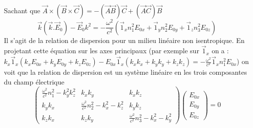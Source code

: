 Sachant que $\vec A\times(\vec B\times \vec C) = -(\vec A\vec B)\vec C+(\vec A\vec C)\vec B$ 
\begin{equation}
\vec k(\vec k . \vec E_0) - \vec E_0 k^2 = -\frac{\omega^2}{c^2}\left(\vec 1_x n_1^ 2 E_{0x}+
\vec 1_y n_2^ 2 E_{0y}+\vec 1_z n_3^ 2 E_{0z}\right)
\end{equation}
Il s'agit de la relation de dispersion pour un milieu linéaire non isentropique. En projetant cette équation 
sur les axes principaux (par exemple sur $\vec 1_x$ on a : $k_x \vec 1_x \left(k_x E_{0x} + k_y E_{0y} + k_z E_{0z}\right) - E_{0x} \vec 1_x\left(k_xk_x + k_y k_y + k_z k_z\right) =
-\frac{\omega^2}{c^2} \vec 1_x n_1^2 E_{0x}$) on voit que la relation de dispersion est un système linéaire
en les trois composantes du champ électrique
\begin{equation}
\left(\begin{array}{ccc}
\frac{\omega^2}{c^2}n_1^2-k_y^2k_z^2 & k_xk_y & k_xk_z\\
k_yk_x & \frac{\omega^2}{c^2}n_2^2-k_x^2-k_z^2 & k_yk_z\\
k_zk_x & k_zk_y & \frac{\omega^2}{c^2}n_3^2-k_x^2-k_y^2
\end{array}\right)\left(\begin{array}{c}
E_{0x}\\
E_{0y}\\
E_{0z}
\end{array}\right) = 0
\label{eq:4.19}
\end{equation}



